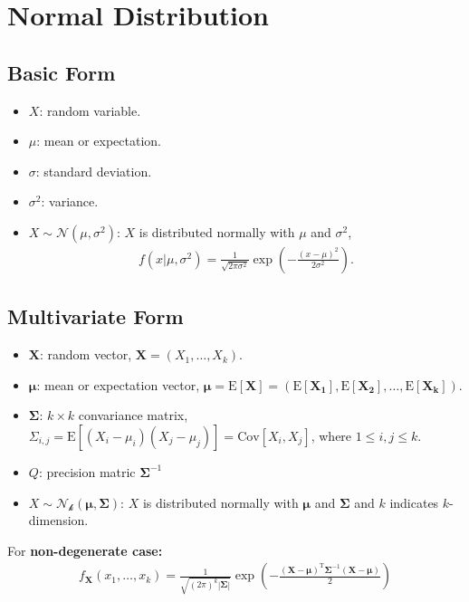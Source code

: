 \documentclass[../statistics.tex]{subfiles}
\begin{document}
\chapter{Normal Distribution}%
\label{sec:normal}
\section{Basic Form}%
\label{sec:basic_form}
\begin{itemize}
  \item $X$: random variable.
  \item $\mu$: mean or expectation.
  \item $\sigma$: standard deviation.
  \item $\sigma^2$: variance.
  \item $X \sim \mathcal{N}(\mu, \sigma^2)$: $X$ is distributed normally with
    $\mu$ and $\sigma^2$,
    \begin{align}
      \label{eq:basic_norm_dist}
      f(x \vert \mu, \sigma^2) = \frac{1}{\sqrt{2\pi \sigma^2}} \exp(- \frac{{(x - \mu)}^2}{2\sigma^2}).
    \end{align}
\end{itemize}

\section{Multivariate Form}%
\label{sec:multi_form}
\begin{itemize}
  \item $\mathbf{X}$: random vector, $\mathbf{X} = (X_1, \ldots, X_k)$.
  \item $\boldsymbol\mu$: mean or expectation vector, $\boldsymbol\mu = \text{E}[\mathbf{X}] = (\text{E}[\mathbf{X_1}], \text{E}[\mathbf{X_2}], \ldots, \text{E}[\mathbf{X_k}])$.
  \item $\boldsymbol\Sigma$: $k \times k$ convariance matrix, $\Sigma_{i,j} = \text{E}[(X_i - \mu_i)(X_j - \mu_j)] = \text{Cov}[X_i, X_j]$, where $1 \leq i, j \leq k$.
  \item $Q$: precision matric $\boldsymbol\Sigma^{-1}$
  \item $X \sim \mathcal{N_k}(\boldsymbol\mu, \boldsymbol\Sigma)$: $X$ is distributed normally with
    $\boldsymbol\mu$ and $\boldsymbol\Sigma$ and $k$ indicates $k$-dimension.
\end{itemize}

For \textbf{non-degenerate case:}
%
\begin{align}
  \label{eq:multi_norm_dist}
  f_{\mathbf{X}}(x_1, \ldots, x_k) = \frac{1}{\sqrt{{(2\pi)}^k |\boldsymbol\Sigma|}} \exp(- \frac{{(\mathbf{X} - \boldsymbol\mu)}^{\text{T}} \boldsymbol\Sigma^{-1} (\mathbf{X} - \boldsymbol\mu)}{2})
\end{align}
\end{document}
